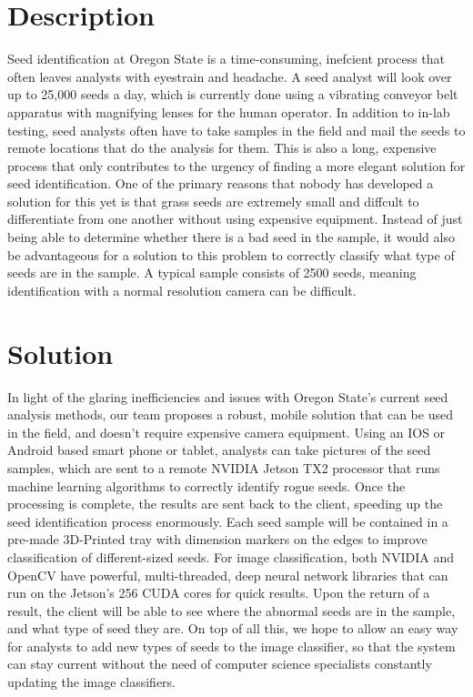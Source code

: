 \documentclass[onecolumn, draftclsnofoot,10pt, compsoc]{IEEEtran}
\begin{document}
\begin{titlepage}
\begin{singlespace}
\begin{abstract}
        \end{abstract}     
    \end{singlespace}
\end{titlepage}
\newpage
{}
\tableofcontents
\clearpage

\section{Description}
Seed identification at Oregon State is a time-consuming, inefcient process that often leaves analysts with eyestrain and headache. A seed analyst will look over up to 25,000 seeds a day, which is currently done using a vibrating conveyor belt apparatus with magnifying lenses for the human operator. In addition to in-lab testing, seed analysts often have to take samples in the field and mail the seeds to remote locations that do the analysis for them. This is also a long, expensive process that only contributes to the urgency of finding a more elegant solution for seed identification. One of the primary reasons that nobody has developed a solution for this yet is that grass seeds are extremely small and diffcult to differentiate from one another without using expensive equipment. Instead of just being able to determine whether there is a bad seed in the sample, it would also be advantageous for a solution to this problem to correctly classify what type of seeds are in the sample. A typical sample consists of 2500 seeds, meaning identification with a normal resolution camera can be difficult.


\section{Solution}
In light of the glaring inefficiencies and issues with Oregon State's current seed analysis methods, our team proposes a robust, mobile solution that can be used in the field, and doesn't require expensive camera equipment. Using an IOS or Android based smart phone or tablet, analysts can take pictures of the seed samples, which are sent to a remote NVIDIA Jetson TX2 processor that runs machine learning algorithms to correctly identify rogue seeds. Once the processing is complete, the results are sent back to the client, speeding up the seed identification process enormously. Each seed sample will be contained in a pre-made 3D-Printed tray with dimension markers on the edges to improve classification of different-sized seeds. For image classification, both NVIDIA and OpenCV have powerful, multi-threaded, deep neural network libraries that can run on the Jetson's 256 CUDA cores for quick results. Upon the return of a result, the client will be able to see where the abnormal seeds are in the sample, and what type of seed they are. On top of all this, we hope to allow an easy way for analysts to add new types of seeds to the image classifier, so that the system can stay current without the need of computer science specialists constantly updating the image classifiers.
\end{document}
